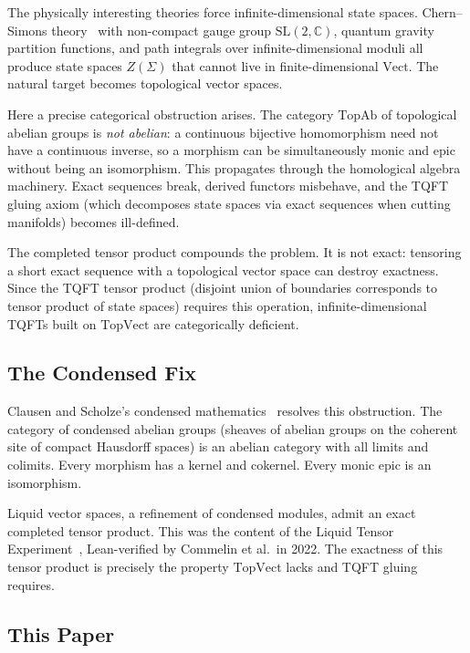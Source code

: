 \documentclass[11pt]{amsart}
\theoremstyle{plain}
\theoremstyle{definition}
\newcommand{\Vect}{\mathrm{Vect}}
\newcommand{\TopAb}{\mathrm{TopAb}}
\newcommand{\TopVect}{\mathrm{TopVect}}
\begin{document}
The physically interesting theories force infinite-dimensional state spaces. Chern--Simons theory~\cite{Witten1988} with non-compact gauge group $\mathrm{SL}(2,\mathbb{C})$, quantum gravity partition functions, and path integrals over infinite-dimensional moduli all produce state spaces $Z(\Sigma)$ that cannot live in finite-dimensional $\Vect$. The natural target becomes topological vector spaces.

Here a precise categorical obstruction arises. The category $\TopAb$ of topological abelian groups is \emph{not abelian}: a continuous bijective homomorphism need not have a continuous inverse, so a morphism can be simultaneously monic and epic without being an isomorphism. This propagates through the homological algebra machinery. Exact sequences break, derived functors misbehave, and the TQFT gluing axiom (which decomposes state spaces via exact sequences when cutting manifolds) becomes ill-defined.

The completed tensor product compounds the problem. It is not exact: tensoring a short exact sequence with a topological vector space can destroy exactness. Since the TQFT tensor product (disjoint union of boundaries corresponds to tensor product of state spaces) requires this operation, infinite-dimensional TQFTs built on $\TopVect$ are categorically deficient.

\subsection{The Condensed Fix}

Clausen and Scholze's condensed mathematics~\cite{Scholze2019} resolves this obstruction. The category of condensed abelian groups (sheaves of abelian groups on the coherent site of compact Hausdorff spaces) is an abelian category with all limits and colimits. Every morphism has a kernel and cokernel. Every monic epic is an isomorphism.

Liquid vector spaces, a refinement of condensed modules, admit an exact completed tensor product. This was the content of the Liquid Tensor Experiment~\cite{Scholze2021,LTE2022}, Lean-verified by Commelin et al.\ in 2022. The exactness of this tensor product is precisely the property $\TopVect$ lacks and TQFT gluing requires.

\subsection{This Paper}
\end{document}
